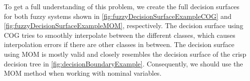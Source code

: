 To get a full understanding of this problem, we create the full decision surfaces for both fuzzy systems shown in \autoref{fig:fuzzyDecisionSurfaceExampleCOG} and \autoref{fig:fuzzyDecisionSurfaceExampleMOM}, respectively. The decision surface using COG tries to smoothly interpolate between the different classes, which causes interpolation errors if there are other classes in between. The decision surface using MOM is mostly valid and closely resembles the decision surface of the crisp decision tree in \autoref{fig:decisionBoundaryExample}. Consequently, we should use the MOM method when working with nominal variables.

\begin{figure}[H]
    \centering
    \begin{subfigure}[t]{0.45\textwidth}
        \centering
\end{subfigure}
\end{figure}
